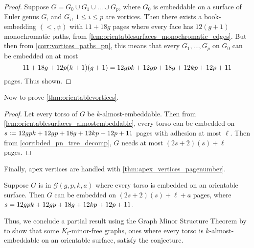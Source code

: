 \begin{proof}
	Suppose $G = G_0 \cup G_1 \cup \ldots \cup G_p$, where $G_0$ is embeddable on a surface of Euler genus $G$, and $G_i$, $1 \leq i \leq p$ are vortices. Then there exists a book-embedding $(<, \psi)$ with $11 + 18g$ pages where every face has $12(g+1)$ monochromatic paths, from \cref{lem:orientablesurfaces_monochromatic_edges}. But then from \cref{corr:vortices_paths_pn}, this means that every $G_1, \ldots, G_p$ on $G_0$ can be embedded on at most \[11 + 18g + 12p(k + 1)(g + 1) = 12gpk + 12gp + 18g + 12kp + 12p + 11 \] pages. Thus shown.
\end{proof}

Now to prove \cref{thm:orientablevortices}. 
\begin{proof}
	Let every torso of $G$ be $k$-almost-embeddable. Then from \cref{lem:orientablesurfaces_almostembeddable}, every torso can be embedded on $s := 12gpk + 12gp + 18g + 12kp + 12p + 11 $ pages with adhesion at most $\ell$. Then from \cref{corr:bded_pn_tree_decomp}, $G$ needs at most $(2s + 2)(s) + \ell$ pages.
\end{proof}

Finally, apex vertices are handled with \cref{thm:apex_vertices_pagenumber}. 
\begin{corollary}\label{corr:orientable_surfaces_gpka}
	Suppose $G$ is in $\mathcal{G}(g, p, k, a)$ where every torso is embedded on an orientable surface. Then $G$ can be embedded on $(2s + 2)(s) + \ell + a$ pages, where $s = 12gpk + 12gp + 18g + 12kp + 12p + 11$. 
\end{corollary}
Thus, we conclude a partial result using the Graph Minor Structure Theorem by  \textcite{robertsonGraphMinorsXVI2003} to show that some $K_t$-minor-free graphs, ones where every torso is $k$-almost-embeddable on an orientable surface, satisfy the conjecture.
